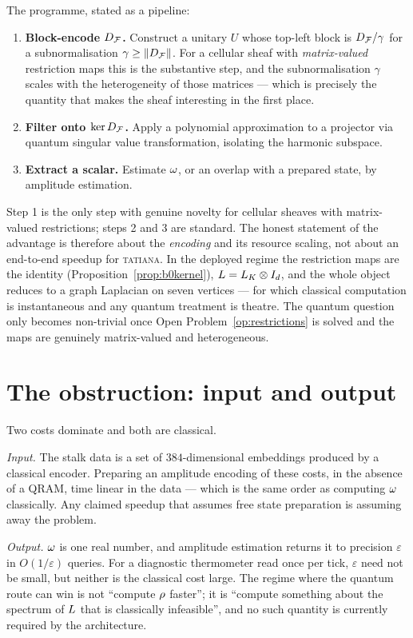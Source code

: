 The programme, stated as a pipeline:
\begin{enumerate}
  \item \textbf{Block-encode $D_{\mathcal{F}}$.} Construct a unitary $U$ whose
        top-left block is $D_{\mathcal{F}}/\gamma$ for a subnormalisation
        $\gamma\ge\left\lVert D_{\mathcal{F}} \right\rVert$. For a cellular sheaf with
        \emph{matrix-valued} restriction maps this is the substantive
        step, and the subnormalisation $\gamma$ scales with the
        heterogeneity of those matrices --- which is precisely the
        quantity that makes the sheaf interesting in the first place.
  \item \textbf{Filter onto $\ker D_{\mathcal{F}}$.} Apply a polynomial
        approximation to a projector via quantum singular value
        transformation, isolating the harmonic subspace.
  \item \textbf{Extract a scalar.} Estimate $\omega$, or an overlap
        with a prepared state, by amplitude estimation.
\end{enumerate}

\begin{remark}
Step 1 is the only step with genuine novelty for cellular sheaves with
matrix-valued restrictions; steps 2 and 3 are standard. The honest
statement of the advantage is therefore about the \emph{encoding} and
its resource scaling, not about an end-to-end speedup for
\textsc{tatiana}. In the deployed regime the restriction maps are the
identity (Proposition~\ref{prop:b0kernel}), $L=L_K\otimes I_d$, and
the whole object reduces to a graph Laplacian on seven vertices --- for
which classical computation is instantaneous and any quantum treatment
is theatre. The quantum question only becomes non-trivial once
Open Problem~\ref{op:restrictions} is solved and the maps are genuinely
matrix-valued and heterogeneous.
\end{remark}

\section{The obstruction: input and output}

\begin{hon}\Hon
Two costs dominate and both are classical.

\emph{Input.} The stalk data is a set of $384$-dimensional embeddings
produced by a classical encoder. Preparing an amplitude encoding of
these costs, in the absence of a QRAM, time linear in the data --- which
is the same order as computing $\omega$ classically. Any claimed
speedup that assumes free state preparation is assuming away the
problem.

\emph{Output.} $\omega$ is one real number, and amplitude estimation
returns it to precision $\varepsilon$ in $O(1/\varepsilon)$ queries. For
a diagnostic thermometer read once per tick, $\varepsilon$ need not be
small, but neither is the classical cost large. The regime where the
quantum route can win is not ``compute $\rho$ faster''; it is
``compute something about the spectrum of $L$ that is classically
infeasible'', and no such quantity is currently required by the
architecture.
\end{hon}

